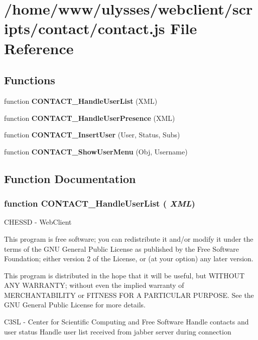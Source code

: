 \section{/home/www/ulysses/webclient/scripts/contact/contact.js File Reference}
\label{contact_2contact_8js}
\subsection*{Functions}
\begin{CompactItemize}
\item 
function {\bf CONTACT\_\-HandleUserList} (XML)
\item 
function {\bf CONTACT\_\-HandleUserPresence} (XML)
\item 
function {\bf CONTACT\_\-InsertUser} (User, Status, Subs)
\item 
function {\bf CONTACT\_\-ShowUserMenu} (Obj, Username)
\end{CompactItemize}


\subsection{Function Documentation}
\subsubsection{\setlength{\rightskip}{0pt plus 5cm}function CONTACT\_\-HandleUserList ( {\em XML})}\label{contact_2contact_8js_0fc9dd46f6e48c722cc884197efe6bd9}


CHESSD - WebClient

This program is free software; you can redistribute it and/or modify it under the terms of the GNU General Public License as published by the Free Software Foundation; either version 2 of the License, or (at your option) any later version.

This program is distributed in the hope that it will be useful, but WITHOUT ANY WARRANTY; without even the implied warranty of MERCHANTABILITY or FITNESS FOR A PARTICULAR PURPOSE. See the GNU General Public License for more details.

C3SL - Center for Scientific Computing and Free Software Handle contacts and user status Handle user list received from jabber server during connection

